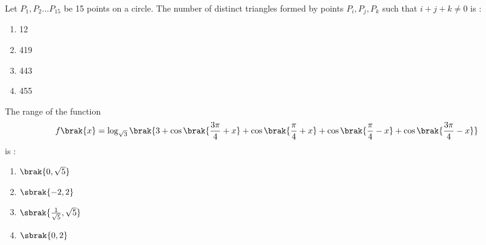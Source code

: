 \iffalse
    \title{2021}
    \author{EE24BTECH11001}
    \section{mcq-single}
\fi
\item 
        Let $P_1, P_2 \dots P_{15}$  be 15 points on a circle. The number of distinct triangles formed by points $P_i, P_j, P_k$ such that 
        $i + j +k \ne 0$ is :
        \hfill{}
        \begin{multicols}{4}
            \begin{enumerate}
                \item 12
                    \columnbreak
                \item 419
                    \columnbreak
                \item 443
                    \columnbreak
                \item 455
            \end{enumerate}
        \end{multicols}

    \item The range of the function 
        \begin{align}
            f\brak{x} = \log_{\sqrt{3}} \brak{3 + \cos \brak{\frac{3\pi}{4} + x} + \cos \brak{\frac{\pi}{4} + x}+ \cos \brak{\frac{\pi}{4} - x} +\cos \brak{\frac{3\pi}{4} - x}}
        \end{align} is :
        \hfill{}
        \begin{multicols}{4}
            \begin{enumerate}
                \item $\brak{0,  \sqrt{5}}$ \columnbreak
                \item $\sbrak{-2, 2}$ \columnbreak
                \item $\sbrak{\frac{1}{\sqrt{5}}, \sqrt{5}}$ \columnbreak
                \item $\sbrak{0, 2}$
            \end{enumerate}
        \end{multicols}


